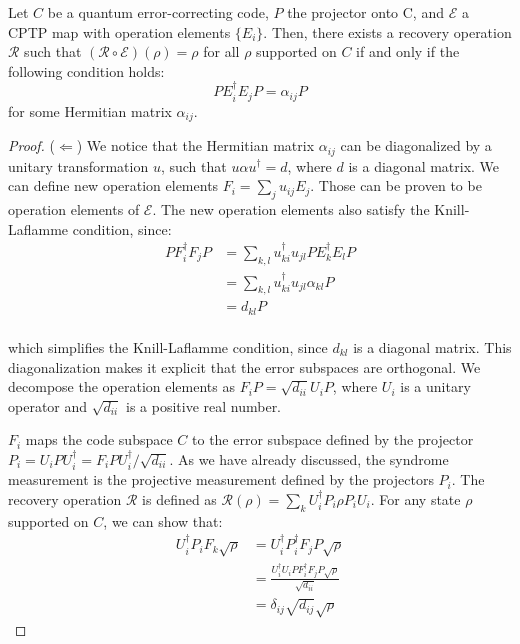 \documentclass[12pt, twoside, openany]{book}
\begin{document}
\begin{theorem} \label{Knill-Laflamme}
Let $C$ be a quantum error-correcting code, $P$ the projector onto C, and $\mathcal{E}$ a CPTP map with operation elements $\{E_i\}$. Then, there exists a recovery operation $\mathcal{R}$ such that $(\mathcal{R} \circ \mathcal{E})(\rho) = \rho$ for all $\rho$ supported on $C$ if and only if the following condition holds:
\begin{equation} \label{KL}
    P E_i^\dagger E_j P = \alpha_{ij} P
\end{equation}
for some Hermitian matrix $\alpha_{ij}$.
\end{theorem}

\begin{proof}
    ($\Leftarrow$) We notice that the Hermitian matrix $\alpha_{ij}$ can be diagonalized by a unitary transformation $u$, such that $u \alpha u^\dagger = d$, where $d$ is a diagonal matrix. We can define new operation elements $F_i = \sum_j u_{ij} E_j$. Those can be proven to be operation elements of $\mathcal{E}$. The new operation elements also satisfy the Knill-Laflamme condition, since:
\begin{align*}
    P F_i^\dagger F_j P &= \sum_{k,l} u_{ki}^\dagger u_{jl} P E_k^\dagger E_l P \\
    &= \sum_{k,l} u_{ki}^\dagger u_{jl} \alpha_{kl} P \\
    &= d_{kl} P \\
\end{align*}

which simplifies the Knill-Laflamme condition, since $d_{kl}$ is a diagonal matrix. This diagonalization makes it explicit that the error subspaces are orthogonal. We decompose the operation elements as $F_i P = \sqrt{d_{ii}} U_i P$, where $U_i$ is a unitary operator and $\sqrt{d_{ii}}$ is a positive real number.

$F_i$ maps the code subspace $C$ to the error subspace defined by the projector $P_i = U_i P U_i^\dagger = F_i P U_i^\dagger / \sqrt{d_{ii}}$. As we have already discussed, the syndrome measurement is the projective measurement defined by the projectors $P_i$. The recovery operation $\mathcal{R}$ is defined as $\mathcal{R}(\rho) = \sum_k U_i^\dagger P_i \rho P_i U_i$. For any state $\rho$ supported on $C$, we can show that:
\begin{align*}
    U_i^\dagger P_i F_k \sqrt{\rho} &=  U_i^\dagger P_i^\dagger F_j P \sqrt{\rho} \\
    &= \frac{U_i^\dagger U_i P F_i^\dagger F_j P \sqrt{\rho}}{\sqrt{d_{ii}}} \\
    &= \delta_{ij} \sqrt{d_{ij}} \sqrt{\rho}
\end{align*}


\end{proof}
\end{document}
